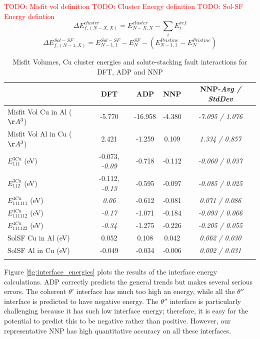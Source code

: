 \documentclass{article}
\begin{document}
\textcolor{red}{TODO: Misfit vol definition}
\textcolor{red}{TODO: Cluster Energy definition}
\textcolor{red}{TODO: Sol-SF Energy defintion}
\begin{equation}
\Delta E^{cluster}_{f,(N-X,X)} = E^{cluster}_{N-X,X} - \sum_i E^{ref}_i
\end{equation}
\begin{equation}
\Delta E^{Sol-SF}_{f,(N-1,X)} = E^{Sol-SF}_{N-1,1} - E^{SF}_{N} - (E^{Pristine}_{N-1,1}-E^{Pristine}_{N})
\end{equation}



\begin{table}[h!]
\begin{tabular}{l|cccc}%
\hline%
&DFT&ADP&NNP& NNP-\emph{Avg / StdDev}\\%
\hline%
Misfit Vol Cu in Al ($\AA^3$)&{-}5.770&{-}16.958&{-}4.380&\emph{-7.095 / 1.076}\\%
Misfit Vol Al in Cu ($\AA^3$)&2.421&{-}1.259&0.109&\emph{1.334 / 0.857}\\%
$E^{3Cu}_{111}$ (eV)&{-}0.073, \emph{-0.09}\cite{Gorbatov2019EffectiveAlloys}&{-}0.718&{-}0.112&\emph{-0.060 / 0.037}\\%
$E^{3Cu}_{112}$ (eV)&{-}0.112, \emph{-0.13}\cite{Gorbatov2019EffectiveAlloys}&{-}0.595&{-}0.097&\emph{-0.085 / 0.025}\\%
$E^{4Cu}_{111111}$ (eV)&\emph{0.06}\cite{Gorbatov2019EffectiveAlloys}&{-}0.612&{-}0.081&\emph{0.071 / 0.086}\\%
$E^{4Cu}_{111112}$ (eV)&\emph{-0.17}\cite{Gorbatov2019EffectiveAlloys}&{-}1.071&{-}0.184&\emph{-0.093 / 0.066}\\%
$E^{4Cu}_{111122}$ (eV)&\emph{-0.34}\cite{Gorbatov2019EffectiveAlloys}&{-}1.275&{-}0.226&\emph{-0.205 / 0.055}\\%
SolSF Cu in Al (eV)&0.052&0.108&0.042&\emph{0.062 / 0.030}\\%
SolSF Al in Cu (eV)&{-}0.049&{-}0.034&{-}0.006&\emph{0.002 / 0.031}\\%
\label{table:solute_special}
\end{tabular}%
\caption{Misfit Volumes, Cu cluster energies and solute-stacking fault interactions for DFT, ADP and NNP}
\end{table}


Figure \ref{fig:interface_energies} plots the results of the interface energy calculations.
ADP correctly predicts the general trends but makes several serious errors.
The coherent $\theta'$ interface has much too high an energy, while all the $\theta''$ interface is predicted to have negative energy.
The $\theta''$ interface is particularly challenging because it has such low interface energy; therefore, it is easy for the potential to predict this to be negative rather than positive.
However, our representative NNP has high quantitative accuracy on all these interfaces.
\end{document}
